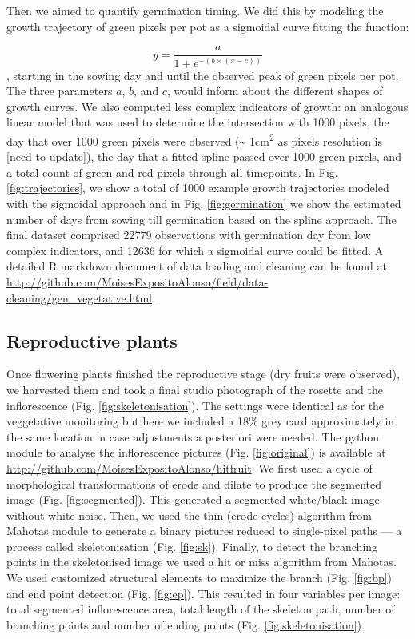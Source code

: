\documentclass[12pt,]{article}
\begin{document}
Then we aimed to quantify germination timing. We did this by modeling
the growth trajectory of green pixels per pot as a sigmoidal curve
fitting the function:

\[y = \frac{a}{1 + e^{-(b  \times   (x-c))} } \] , starting in the
sowing day and until the observed peak of green pixels per pot. The
three parameters \(a\), \(b\), and \(c\), would inform about the
different shapes of growth curves. We also computed less complex
indicators of growth: an analogous linear model that was used to
determine the intersection with 1000 pixels, the day that over 1000
green pixels were observed (\textasciitilde{} 1cm\textsuperscript{2} as
pixels resolution is {[}need to update{]}), the day that a fitted spline
passed over 1000 green pixels, and a total count of green and red pixels
through all timepoints. In Fig. \ref{fig:trajectories}, we show a total
of 1000 example growth trajectories modeled with the sigmoidal approach
and in Fig. \ref{fig:germination} we show the estimated number of days
from sowing till germination based on the spline approach. The final
dataset comprised 22779 observations with germination day from low
complex indicators, and 12636 for which a sigmoidal curve could be
fitted. A detailed R markdown document of data loading and cleaning can
be found at
\url{http://github.com/MoisesExpositoAlonso/field/data-cleaning/gen_vegetative.html}.

\subsection{Reproductive plants}\label{reproductive-plants}

Once flowering plants finished the reproductive stage (dry fruits were
observed), we harvested them and took a final studio photograph of the
rosette and the inflorescence (Fig. \ref{fig:skeletonisation}). The
settings were identical as for the veggetative monitoring but here we
included a 18\% grey card approximately in the same location in case
adjustments a posteriori were needed. The python module to analyse the
inflorescence pictures (Fig. \ref{fig:original}) is available at
\url{http://github.com/MoisesExpositoAlonso/hitfruit}. We first used a
cycle of morphological transformations of erode and dilate to produce
the segmented image (Fig. \ref{fig:segmented}). This generated a
segmented white/black image without white noise. Then, we used the thin
(erode cycles) algorithm from Mahotas module to generate a binary
pictures reduced to single-pixel paths --- a process called
skeletonisation (Fig. \ref{fig:sk}). Finally, to detect the branching
points in the skeletonised image we used a hit or miss algorithm from
Mahotas. We used customized structural elements to maximize the branch
(Fig. \ref{fig:bp}) and end point detection (Fig. \ref{fig:ep}). This
resulted in four variables per image: total segmented inflorescence
area, total length of the skeleton path, number of branching points and
number of ending points (Fig. \ref{fig:skeletonisation}).
\end{document}
